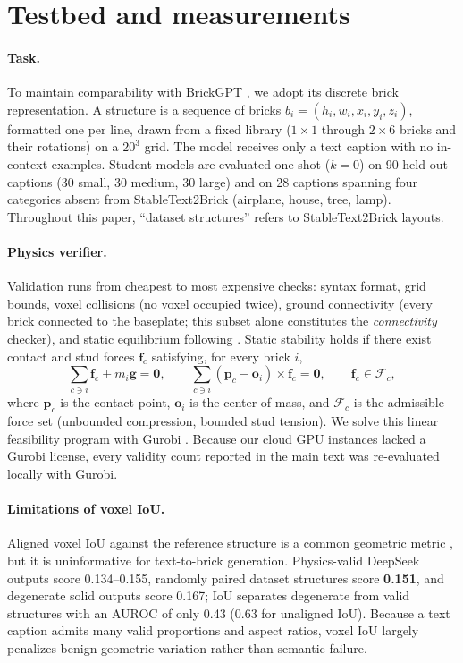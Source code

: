 \documentclass{article}
\begin{document}
\section{Testbed and measurements}
\label{sec:testbed}
\paragraph{Task.} To maintain comparability with BrickGPT \cite{pun2025brickgpt}, we adopt its discrete brick representation. A structure is a sequence of bricks $b_i=(h_i,w_i,x_i,y_i,z_i)$, formatted one per line, drawn from a fixed library ($1\times1$ through $2\times6$ bricks and their rotations) on a $20^3$ grid. The model receives only a text caption with no in-context examples. Student models are evaluated one-shot ($k{=}0$) on 90 held-out captions (30 small, 30 medium, 30 large) and on 28 captions spanning four categories absent from StableText2Brick (airplane, house, tree, lamp). Throughout this paper, ``dataset structures'' refers to StableText2Brick layouts.

\paragraph{Physics verifier.} Validation runs from cheapest to most expensive checks: syntax format, grid bounds, voxel collisions (no voxel occupied twice), ground connectivity (every brick connected to the baseplate; this subset alone constitutes the \emph{connectivity} checker), and static equilibrium following \cite{pun2025brickgpt,luo2015legolization}. Static stability holds if there exist contact and stud forces $\mathbf f_c$ satisfying, for every brick $i$,
\begin{equation}
\textstyle\sum_{c\ni i} \mathbf f_c + m_i\mathbf g = \mathbf 0,\qquad
\sum_{c\ni i} (\mathbf p_c-\mathbf o_i)\times \mathbf f_c = \mathbf 0,\qquad
\mathbf f_c \in \mathcal F_c ,
\label{eq:equil}
\end{equation}
where $\mathbf p_c$ is the contact point, $\mathbf o_i$ is the center of mass, and $\mathcal F_c$ is the admissible force set (unbounded compression, bounded stud tension). We solve this linear feasibility program with Gurobi \cite{gurobi}. Because our cloud GPU instances lacked a Gurobi license, every validity count reported in the main text was re-evaluated locally with Gurobi.

\paragraph{Limitations of voxel IoU.} Aligned voxel IoU against the reference structure is a common geometric metric \cite{stable2026}, but it is uninformative for text-to-brick generation. Physics-valid DeepSeek outputs score 0.134--0.155, randomly paired dataset structures score \textbf{0.151}, and degenerate solid outputs score 0.167; IoU separates degenerate from valid structures with an AUROC of only 0.43 (0.63 for unaligned IoU). Because a text caption admits many valid proportions and aspect ratios, voxel IoU largely penalizes benign geometric variation rather than semantic failure.
\end{document}
